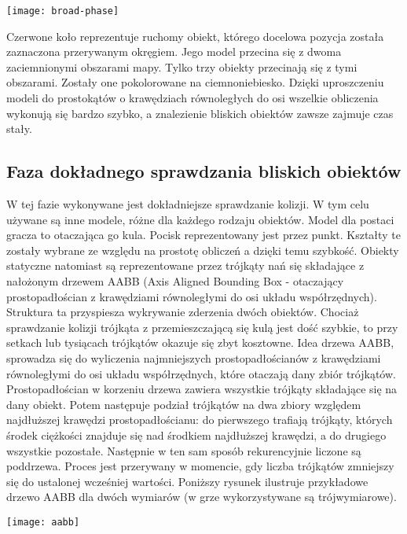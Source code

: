 \documentclass[licencjacka]{pracamgr}
\begin{document}
\begin{center}
\texttt{[image: broad-phase]}
\end{center}

Czerwone koło reprezentuje ruchomy obiekt, którego docelowa pozycja została zaznaczona przerywanym okręgiem. Jego model przecina się z dwoma zaciemnionymi obszarami mapy. Tylko trzy obiekty przecinają się z tymi obszarami. Zostały one pokolorowane na ciemnoniebiesko. Dzięki uproszczeniu modeli do prostokątów o krawędziach równoległych do osi wszelkie obliczenia wykonują się bardzo szybko, a znalezienie bliskich obiektów zawsze zajmuje czas stały.

\subsection{Faza dokładnego sprawdzania bliskich obiektów}

W tej fazie wykonywane jest dokładniejsze sprawdzanie kolizji. W tym celu używane są inne modele, różne dla każdego rodzaju obiektów. Model dla postaci gracza to otaczająca go kula. Pocisk reprezentowany jest przez punkt. Kształty te zostały wybrane ze względu na prostotę obliczeń a dzięki temu szybkość. Obiekty statyczne natomiast są reprezentowane przez trójkąty nań się składające z nałożonym drzewem AABB (Axis Aligned Bounding Box - otaczający prostopadłościan z krawędziami równoległymi do osi układu współrzędnych). Struktura ta przyspiesza wykrywanie zderzenia dwóch obiektów. Chociaż sprawdzanie kolizji trójkąta z przemieszczającą się kulą jest dość szybkie, to przy setkach lub tysiącach trójkątów okazuje się zbyt kosztowne. Idea drzewa AABB, sprowadza się do wyliczenia najmniejszych prostopadłościanów z krawędziami  równoległymi do osi układu współrzędnych, które otaczają dany zbiór trójkątów. Prostopadłościan w korzeniu drzewa zawiera wszystkie trójkąty składające się na dany obiekt. Potem następuje podział trójkątów na dwa zbiory względem najdłuższej krawędzi prostopadłościanu: do pierwszego trafiają trójkąty, których środek ciężkości znajduje się nad środkiem najdłuższej krawędzi, a do drugiego wszystkie pozostałe. Następnie w ten sam sposób rekurencyjnie liczone są poddrzewa. Proces jest przerywany w momencie, gdy liczba trójkątów zmniejszy się do ustalonej wcześniej wartości. Poniższy rysunek ilustruje przykładowe drzewo AABB dla dwóch wymiarów (w grze wykorzystywane są trójwymiarowe).

\begin{center}
\texttt{[image: aabb]}
\end{center}
\end{document}
